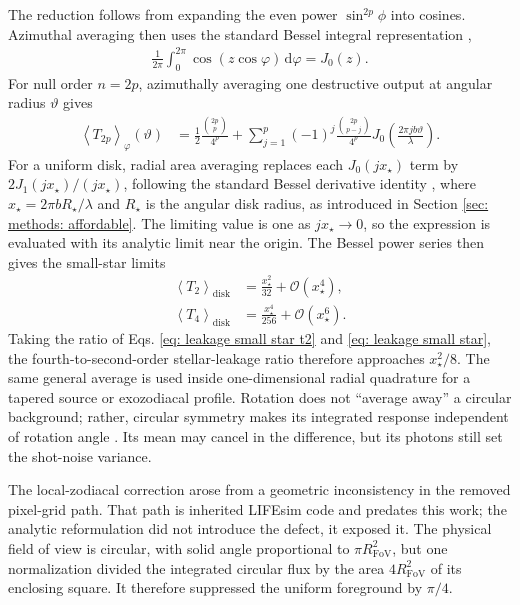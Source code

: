 \documentclass[12pt,a4paper]{article}
\numberwithin{equation}{section}
\numberwithin{figure}{section}
\numberwithin{table}{section}
\begin{document}
The reduction follows from expanding the even power $\sin^{2p}\phi$ into cosines. Azimuthal averaging then uses the standard Bessel integral representation \cite{nistdlmf},
\begin{align}
\frac{1}{2\pi}\int_0^{2\pi}\cos(z\cos\varphi)\,\mathrm{d}\varphi=J_0(z).
\end{align}
For null order $n=2p$, azimuthally averaging one destructive output at angular radius $\vartheta$ gives
\begin{align}
\left\langle T_{2p}\right\rangle_\varphi(\vartheta)
&=
\frac{1}{2}\frac{\binom{2p}{p}}{4^p}
+\sum_{j=1}^{p}(-1)^j\frac{\binom{2p}{p-j}}{4^p}
J_0\left(\frac{2\pi j b\vartheta}{\lambda}\right).
\label{eq: general null average}
\end{align}
For a uniform disk, radial area averaging replaces each $J_0(jx_\star)$ term by $2J_1(jx_\star)/(jx_\star)$, following the standard Bessel derivative identity \cite{nistdlmf}, where $x_\star=2\pi bR_\star/\lambda$ and $R_\star$ is the angular disk radius, as introduced in Section \ref{sec: methods: affordable}. The limiting value is one as $jx_\star\rightarrow0$, so the expression is evaluated with its analytic limit near the origin. The Bessel power series then gives the small-star limits
\begin{align}
\left\langle T_2\right\rangle_\mathrm{disk}
&=\frac{x_\star^2}{32}+\mathcal{O}(x_\star^4),\label{eq: leakage small star t2}\\
\left\langle T_4\right\rangle_\mathrm{disk}
&=\frac{x_\star^4}{256}+\mathcal{O}(x_\star^6).
\label{eq: leakage small star}
\end{align}
Taking the ratio of Eqs. \ref{eq: leakage small star t2} and \ref{eq: leakage small star}, the fourth-to-second-order stellar-leakage ratio therefore approaches $x_\star^2/8$. The same general average is used inside one-dimensional radial quadrature for a tapered source or exozodiacal profile. Rotation does not ``average away'' a circular background; rather, circular symmetry makes its integrated response independent of rotation angle \cite{lay2004systematic,dannert2022life2}. Its mean may cancel in the difference, but its photons still set the shot-noise variance.

The local-zodiacal correction arose from a geometric inconsistency in the removed pixel-grid path. That path is inherited LIFEsim code and predates this work; the analytic reformulation did not introduce the defect, it exposed it. The physical field of view is circular, with solid angle proportional to $\pi R_\mathrm{FoV}^2$, but one normalization divided the integrated circular flux by the area $4R_\mathrm{FoV}^2$ of its enclosing square. It therefore suppressed the uniform foreground by $\pi/4$.
\end{document}
